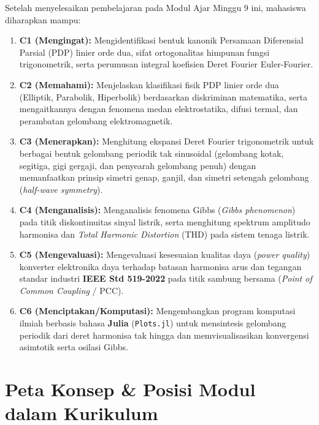 \documentclass[11pt,a4paper]{article}
\theoremstyle{definition}
\begin{document}
\begin{tcolorbox}[colback=blue!5!white,colframe=headercolor,title=\textbf{Capaian Pembelajaran Khusus (Sub-CPMK 5)}]
Setelah menyelesaikan pembelajaran pada Modul Ajar Minggu 9 ini, mahasiswa diharapkan mampu:
\begin{enumerate}[leftmargin=*]
    \item \textbf{C1 (Mengingat):} Mengidentifikasi bentuk kanonik Persamaan Diferensial Parsial (PDP) linier orde dua, sifat ortogonalitas himpunan fungsi trigonometrik, serta perumusan integral koefisien Deret Fourier Euler-Fourier.
    \item \textbf{C2 (Memahami):} Menjelaskan klasifikasi fisik PDP linier orde dua (Elliptik, Parabolik, Hiperbolik) berdasarkan diskriminan matematika, serta mengaitkannya dengan fenomena medan elektrostatika, difusi termal, dan perambatan gelombang elektromagnetik.
    \item \textbf{C3 (Menerapkan):} Menghitung ekspansi Deret Fourier trigonometrik untuk berbagai bentuk gelombang periodik tak sinusoidal (gelombang kotak, segitiga, gigi gergaji, dan penyearah gelombang penuh) dengan memanfaatkan prinsip simetri genap, ganjil, dan simetri setengah gelombang (\textit{half-wave symmetry}).
    \item \textbf{C4 (Menganalisis):} Menganalisis fenomena Gibbs (\textit{Gibbs phenomenon}) pada titik diskontinuitas sinyal listrik, serta menghitung spektrum amplitudo harmonisa dan \textit{Total Harmonic Distortion} (THD) pada sistem tenaga listrik.
    \item \textbf{C5 (Mengevaluasi):} Mengevaluasi kesesuaian kualitas daya (\textit{power quality}) konverter elektronika daya terhadap batasan harmonisa arus dan tegangan standar industri \textbf{IEEE Std 519-2022} pada titik sambung bersama (\textit{Point of Common Coupling} / PCC).
    \item \textbf{C6 (Menciptakan/Komputasi):} Mengembangkan program komputasi ilmiah berbasis bahasa \textbf{Julia} (\texttt{Plots.jl}) untuk mensintesis gelombang periodik dari deret harmonisa tak hingga dan memvisualisasikan konvergensi asimtotik serta osilasi Gibbs.
\end{enumerate}
\end{tcolorbox}

\vspace{0.3cm}
\tableofcontents
\vspace{0.5cm}

\newpage

\section{Peta Konsep \& Posisi Modul dalam Kurikulum}
\end{document}
